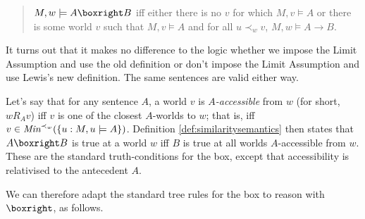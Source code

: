 \begin{quote}
  $M,w \models A \boxright B$ iff either there is no $v$ for
  which $M,v\models A$ or there is some world $v$ such that
  $M,v\models A$ and for all $u \prec_w v$, $M,w \models A \to B$.
\end{quote}
%
It turns out that it makes no difference to the logic whether we impose the
Limit Assumption and use the old definition or don't impose the Limit Assumption
and use Lewis's new definition. The same sentences are valid either
way. %


\iffalse

Let's say that for any sentence $A$, a world $v$ is \emph{$A$-accessible} from
$w$ (for short, $wR_Av$) iff $v$ is one of the closest $A$-worlds to $w$; that
is, iff $v \in \emph{Min}^{\prec_w}(\{u: M,u \models A\})$. Definition
\ref{def:similaritysemantics} then states that $A \boxright B$ is true at a
world $w$ iff $B$ is true at all worlds $A$-accessible from $w$. These are the
standard truth-conditions for the box, except that accessibility is relativised
to the antecedent $A$.

We can therefore adapt the standard tree rules for the box to reason with
$\boxright$, as follows.

\bigskip
\begin{center}
\begin{minipage}{0.4\textwidth} \centering
{}
\end{minipage}
\begin{minipage}{0.4\textwidth}\centering
{}
\end{minipage}
\end{center}
\bigskip

